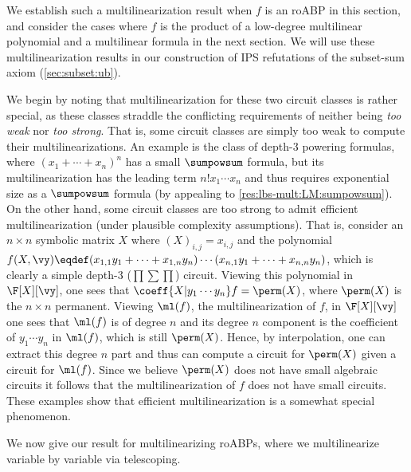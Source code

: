 \documentclass{toc}
\begin{document}
We establish such a multilinearization result when $f$ is an roABP in this section, and consider the cases where $f$ is the product of a low-degree multilinear polynomial and a multilinear formula in the next section.  We will use these multilinearization results in our construction of IPS refutations of the subset-sum axiom (\autoref{sec:subset:ub}).

We begin by noting that multilinearization for these two circuit classes is rather special, as these classes straddle the conflicting requirements of neither being \emph{too weak} nor \emph{too strong}.  That is, some circuit classes are simply too weak to compute their multilinearizations.  An example is the class of depth-3 powering formulas, where $(x_1+\cdots+x_n)^n$ has a small $\sumpowsum$ formula, but its multilinearization has the leading term $n!x_1\cdots x_n$ and thus requires exponential size as a $\sumpowsum$ formula (by appealing to \autoref{res:lbs-mult:LM:sumpowsum}). On the other hand, some circuit classes are too strong to admit efficient multilinearization (under plausible complexity assumptions).  That is, consider an $n \times n$ symbolic matrix $X$ where $(X)_{i,j}=x_{i,j}$ and the polynomial $f(X,\vy)\eqdef (x_{1,1} y_1+\cdots +x_{1,n}y_n)\cdots (x_{n,1} y_1+\cdots +x_{n,n}y_n)$, which is clearly a simple depth-3 ($\prod\sum\prod$) circuit.  Viewing this polynomial in $\F[X][\vy]$, one sees that $\coeff{X|y_1\cdots y_n} f=\perm(X)$, where $\perm(X)$ is the $n\times n$ permanent.  Viewing $\ml(f)$, the multilinearization of $f$, in $\F[X][\vy]$ one sees that $\ml(f)$ is of degree $n$ and its degree $n$ component is the coefficient of $y_1\cdots y_n$ in $\ml(f)$, which is still $\perm(X)$.  Hence, by interpolation, one can extract this degree $n$ part and thus can compute a circuit for $\perm(X)$ given a circuit for $\ml(f)$.  Since we believe $\perm(X)$ does not have small algebraic circuits it follows that the multilinearization of $f$ does not have small circuits. These examples show that efficient multilinearization is a somewhat special phenomenon.

We now give our result for multilinearizing roABPs, where we multilinearize variable by variable via telescoping.
\end{document}
